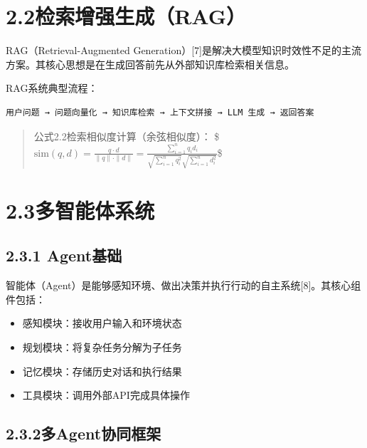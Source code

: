 \documentclass{harryopo-report}
\begin{document}
\section*{2.2检索增强生成（RAG）}

RAG（Retrieval-Augmented Generation）[7]是解决大模型知识时效性不足的主流方案。其核心思想是在生成回答前先从外部知识库检索相关信息。

RAG系统典型流程：

\begin{lstlisting}[style=plainstyle,caption={}]
用户问题 → 问题向量化 → 知识库检索 → 上下文拼接 → LLM 生成 → 返回答案
\end{lstlisting}

\begin{quote}
{\fzht 公式2.2}检索相似度计算（余弦相似度）：
\$$\text{sim}(q, d) = \frac{q \cdot d}{\|q\| \cdot \|d\|} = \frac{\sum_{i=1}^{n} q_i d_i}{\sqrt{\sum_{i=1}^{n} q_i^2} \sqrt{\sum_{i=1}^{n} d_i^2}}$\$
\end{quote}

\section*{2.3多智能体系统}

\subsection*{2.3.1 Agent基础}

智能体（Agent）是能够感知环境、做出决策并执行行动的自主系统[8]。其核心组件包括：

\begin{itemize}
  \item {\fzht 感知模块}：接收用户输入和环境状态
  \item {\fzht 规划模块}：将复杂任务分解为子任务
  \item {\fzht 记忆模块}：存储历史对话和执行结果
  \item {\fzht 工具模块}：调用外部API完成具体操作
\end{itemize}

\subsection*{2.3.2多Agent协同框架}
\end{document}
